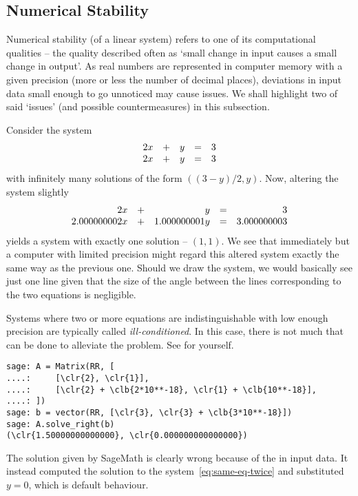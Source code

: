 \subsection{Numerical Stability}
\label{ssec:numerical-stability}

Numerical stability (of a linear system) refers to one of its computational
qualities -- the quality described often as `small change in input causes a
small change in output'. As real numbers are represented in computer memory with
a given precision (more or less the number of decimal places), deviations in
input data small enough to go unnoticed may cause issues. We shall highlight two
of said `issues' (and possible countermeasures) in this subsection.

Consider the system
\begin{equation}
 \label{eq:same-eq-twice}
 \begin{array}{r c r c r}
  2x & + & y & = & 3\\
  2x & + & y & = & 3
 \end{array}
\end{equation}
with infinitely many solutions of the form $((3-y) / 2, y)$. Now, altering the
system slightly
\[
 \begin{array}{r c r c r}
  2x & + & y & = & 3\\
  2.000000002x & + & 1.000000001y & = & 3.000000003
 \end{array}
\]
yields a system with exactly one solution -- $(1,1)$. We see that immediately
but a computer with limited precision might regard this altered system exactly
the same way as the previous one. Should we draw the system, we would basically
see just one line given that the size of the angle between the lines
corresponding to the two equations is negligible.

Systems where two or more equations are indistinguishable with low enough
precision are typically called \emph{ill-conditioned}. In this case, there is
not much that can be done to alleviate the problem. See for yourself.
\begin{Verbatim}
sage: A = Matrix(RR, [
....:     [\clr{2}, \clr{1}],
....:     [\clr{2} + \clb{2*10**-18}, \clr{1} + \clb{10**-18}],
....: ])
sage: b = vector(RR, [\clr{3}, \clr{3} + \clb{3*10**-18}])
sage: A.solve_right(b)
(\clr{1.50000000000000}, \clr{0.000000000000000})
\end{Verbatim}
The solution given by SageMath is clearly wrong because of the  in input data. It instead computed the solution to the
system~\eqref{eq:same-eq-twice} and substituted $y = 0$, which is default
behaviour.

